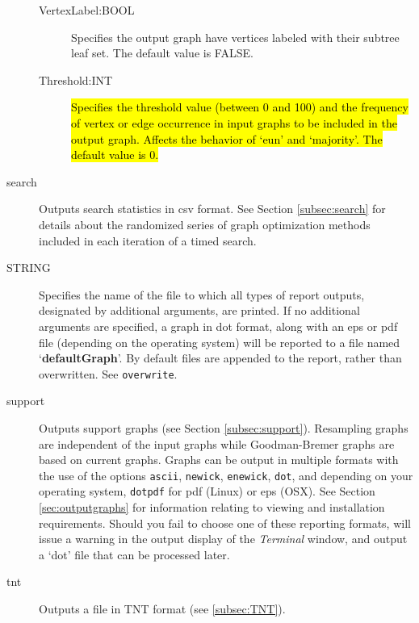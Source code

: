 \begin{description}
\begin{description}
			\item [VertexLabel:BOOL] Specifies the output graph have vertices 
			labeled with their subtree leaf set. The default value is FALSE.
						
		\item [Threshold:INT] \hl{Specifies the threshold value (between 0 and 100) 
		and the frequency of vertex or edge occurrence in input graphs to be included 
		in the output graph. Affects the behavior of `eun' and `majority'. The default value
		is $0$.}		
		\end{description}	
				
		\item[search] Outputs search statistics in csv format. See Section 
		\ref{subsec:search} for details about the randomized series of graph 
		optimization methods included in each iteration of a timed search.
			
		\item [STRING] Specifies the name of the file to which all types of report 
		outputs, designated by additional arguments, are printed. If no additional 
		arguments are specified, a graph in dot format, along with an eps or pdf 
		file (depending on the operating system) will be reported to a file named 
		`\textbf{defaultGraph}'. By default files are appended to the report, rather 
		than overwritten. See \texttt{overwrite}.
				
		\item[support] Outputs support graphs (see Section \ref{subsec:support}). 
		Resampling graphs \citep{Farrisetal1996} are independent of the input graphs 
		while Goodman-Bremer graphs \citep{Goodmanetal1982, bremer1994} are 
		based on current graphs. Graphs can be output in multiple formats with the
		use of the options \texttt{ascii}, \texttt{newick}, \texttt{enewick}, \texttt{dot}, 
		and depending on your operating system, \texttt{dotpdf} for pdf (Linux) or 
		eps (OSX). See Section \ref{sec:outputgraphs} for information relating to 
		viewing and installation requirements. Should you fail to choose one of 
		these reporting formats, \phyg will issue a warning in the output display 
		of the \textit{Terminal} window, and output a `dot' file that can be processed 
		later.
		
		\item[tnt] Outputs a file in TNT \citep{Goloboffetal2008} format (see 
		\ref{subsec:TNT}).
				 
	\end{description}			
		
